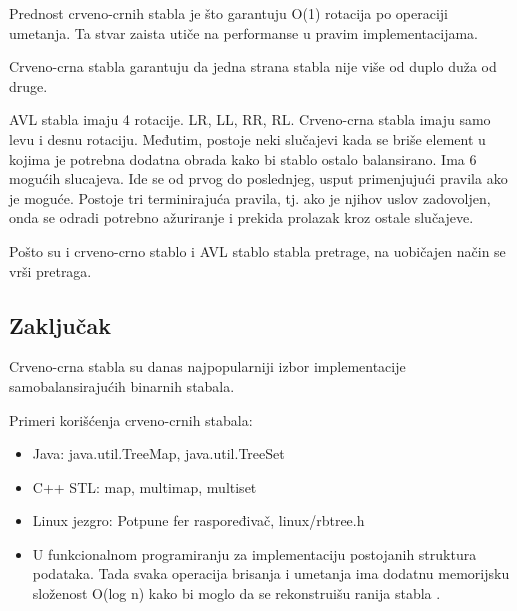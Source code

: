 \documentclass[a4paper]{article}
\begin{document}
    Prednost crveno-crnih stabla je što garantuju O(1) rotacija po operaciji umetanja. 
    Ta stvar zaista utiče na performanse u pravim implementacijama.

    Crveno-crna stabla garantuju da jedna strana stabla nije više od duplo duža od druge.

    AVL stabla imaju 4 rotacije. LR, LL, RR, RL.
    Crveno-crna stabla imaju samo levu i desnu rotaciju. Međutim, postoje neki slučajevi kada se briše element u kojima je potrebna dodatna obrada
    kako bi stablo ostalo balansirano.
    Ima 6 mogućih slucajeva. Ide se od prvog do poslednjeg, usput primenjujući pravila ako je moguće. Postoje tri terminirajuća pravila, tj. 
    ako je njihov uslov zadovoljen, onda se odradi potrebno ažuriranje i prekida prolazak kroz ostale slučajeve.
    
    Pošto su i crveno-crno stablo i AVL stablo stabla pretrage, na uobičajen način se vrši pretraga.

\subsection{Zaključak}
Crveno-crna stabla su danas najpopularniji izbor implementacije samobalansirajućih binarnih stabala.

Primeri korišćenja crveno-crnih stabala:
\begin{itemize}
    \item  Java: java.util.TreeMap, java.util.TreeSet
    \item C++ STL: map, multimap, multiset \cite{gcc}
    \item Linux jezgro: Potpune fer raspoređivač, linux/rbtree.h
    \item U funkcionalnom programiranju za implementaciju postojanih struktura podataka. Tada svaka operacija brisanja i umetanja ima dodatnu memorijsku složenost O(log n) kako bi moglo da se rekonstruišu ranija stabla \cite{persistent}.
\end{itemize}


\appendix
 

\end{document}
